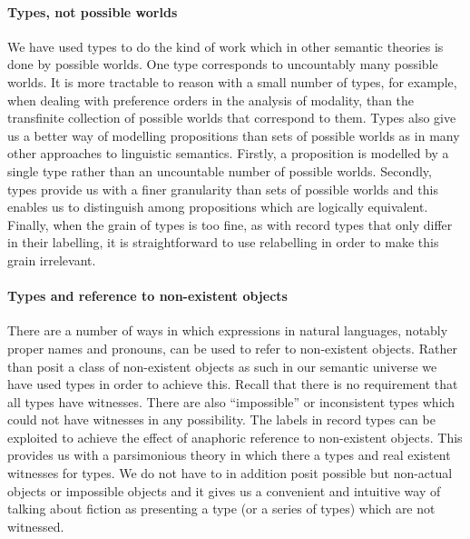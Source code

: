 \paragraph{Types, not possible worlds}  We have used types to do the
kind of work which in other semantic theories is done by possible
worlds.  One type corresponds to uncountably many possible worlds.  It
is more tractable to reason with a small number of types, for example,
when dealing with preference orders in the analysis of modality, than
the transfinite collection of possible worlds that correspond to
them.  Types also give us a better way of modelling propositions than
sets of possible worlds as in many other approaches to linguistic
semantics.  Firstly, a proposition is modelled by a single type rather
than an uncountable number of possible worlds.  Secondly, types
provide us with a finer granularity than sets of possible worlds and this
enables us to distinguish among propositions which are logically
equivalent.  Finally, when the grain of types is too fine, as with
record types that only differ in their labelling, it is
straightforward to use relabelling in order to make this grain irrelevant.

\paragraph{Types and reference to non-existent objects} There are a
number of ways in which expressions in natural languages, notably
proper names and pronouns, can be used to refer to non-existent
objects.  Rather than posit a class of non-existent objects as such in
our semantic universe we have used types in order to achieve this.
Recall that there is no requirement that all types have witnesses.
There are also ``impossible'' or inconsistent types which could not
have witnesses in any possibility.  The labels in record types can be
exploited to achieve the effect of anaphoric reference to non-existent
objects.  This provides us with a parsimonious theory in which there a
types and real existent witnesses for types.  We do not have to in
addition posit possible but non-actual objects or impossible objects
and it gives us a convenient and intuitive way of talking about fiction as
presenting a type (or a series of types) which are not witnessed.


